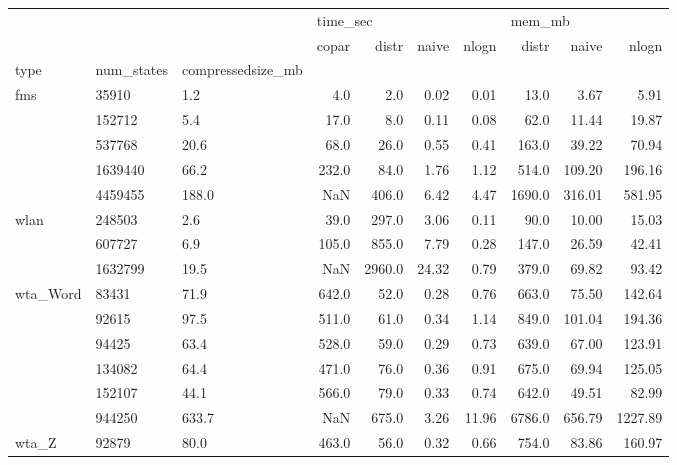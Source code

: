 \begin{tabular}{lllrrrrrrr}
\toprule
             &         &       & \multicolumn{4}{l}{time\_sec} & \multicolumn{3}{l}{mem\_mb} \\
             &         &       &    copar &   distr &  naive &  nlogn &   distr &   naive &    nlogn \\
type & num\_states & compressedsize\_mb &          &         &        &        &         &         &          \\
\midrule
fms & 35910   & 1.2   &      4.0 &     2.0 &   0.02 &   0.01 &    13.0 &    3.67 &     5.91 \\
             & 152712  & 5.4   &     17.0 &     8.0 &   0.11 &   0.08 &    62.0 &   11.44 &    19.87 \\
             & 537768  & 20.6  &     68.0 &    26.0 &   0.55 &   0.41 &   163.0 &   39.22 &    70.94 \\
             & 1639440 & 66.2  &    232.0 &    84.0 &   1.76 &   1.12 &   514.0 &  109.20 &   196.16 \\
             & 4459455 & 188.0 &      NaN &   406.0 &   6.42 &   4.47 &  1690.0 &  316.01 &   581.95 \\
wlan & 248503  & 2.6   &     39.0 &   297.0 &   3.06 &   0.11 &    90.0 &   10.00 &    15.03 \\
             & 607727  & 6.9   &    105.0 &   855.0 &   7.79 &   0.28 &   147.0 &   26.59 &    42.41 \\
             & 1632799 & 19.5  &      NaN &  2960.0 &  24.32 &   0.79 &   379.0 &   69.82 &    93.42 \\
wta\_Word & 83431   & 71.9  &    642.0 &    52.0 &   0.28 &   0.76 &   663.0 &   75.50 &   142.64 \\
             & 92615   & 97.5  &    511.0 &    61.0 &   0.34 &   1.14 &   849.0 &  101.04 &   194.36 \\
             & 94425   & 63.4  &    528.0 &    59.0 &   0.29 &   0.73 &   639.0 &   67.00 &   123.91 \\
             & 134082  & 64.4  &    471.0 &    76.0 &   0.36 &   0.91 &   675.0 &   69.94 &   125.05 \\
             & 152107  & 44.1  &    566.0 &    79.0 &   0.33 &   0.74 &   642.0 &   49.51 &    82.99 \\
             & 944250  & 633.7 &      NaN &   675.0 &   3.26 &  11.96 &  6786.0 &  656.79 &  1227.89 \\
wta\_Z & 92879   & 80.0  &    463.0 &    56.0 &   0.32 &   0.66 &   754.0 &   83.86 &   160.97 \\

\end{tabular}
